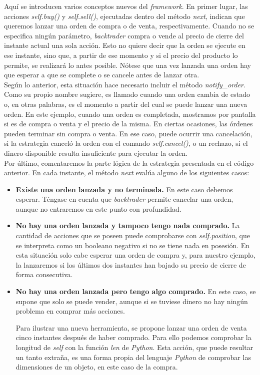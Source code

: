 		Aqu\'i se introducen varios conceptos nuevos del \textit{framework}. En primer lugar, las acciones \textit{self.buy()} y \textit{self.sell()}, ejecutadas dentro del m\'etodo \textit{next}, indican que queremos lanzar una orden de compra o de venta, respectivamente. Cuando no se especifica ning\'un par\'ametro, \textit{backtrader} compra o vende al precio de cierre del instante actual una sola acci\'on. Esto no quiere decir que la orden se ejecute en ese instante, sino que, a partir de ese momento y si el precio del producto lo permite, se realizar\'a lo antes posible. N\'otese que una vez lanzada una orden hay que esperar a que se complete o se cancele antes de lanzar otra.\\
		
		Seg\'un lo anterior, esta situaci\'on hace necesario incluir el m\'etodo \textit{notify\_order}. Como su propio nombre sugiere, es llamado cuando una orden cambia de estado o, en otras palabras, es el momento a partir del cual se puede lanzar una nueva orden. En este ejemplo, cuando una orden es completada, mostramos por pantalla si es de compra o venta y el precio de la misma. En ciertas ocasiones, las \'ordenes pueden terminar sin compra o venta. En ese caso, puede ocurrir una cancelaci\'on, si la estrategia cancel\'o la orden con el comando \textit{self.cancel()}, o un rechazo, si el dinero disponible resulta insuficiente para ejecutar la orden.\\
		
		Por \'ultimo, comentaremos la parte l\'ogica de la estrategia presentada en el c\'odigo anterior. En cada instante, el m\'etodo \textit{next} eval\'ua alguno de los siguientes casos:\\
		
		\begin{itemize}
			\item \textbf{Existe una orden lanzada y no terminada.} En este caso debemos esperar. T\'engase en cuenta que \textit{backtrader} permite cancelar una orden, aunque no entraremos en este punto con profundidad.
			\item \textbf{No hay una orden lanzada y tampoco tengo nada comprado.} La cantidad de acciones que se poseen puede comprobarse con \textit{self.position}, que se interpreta como un booleano negativo si no se tiene nada en posesi\'on. En esta situaci\'on solo cabe esperar una orden de compra y, para nuestro ejemplo, la lanzaremos si los \'ultimos dos instantes han bajado su precio de cierre de forma consecutiva.
			\item \textbf{No hay una orden lanzada pero tengo algo comprado.} En este caso, se supone que solo se puede vender, aunque si se tuviese dinero no hay ning\'un problema en comprar m\'as acciones.
			
			 Para ilustrar una nueva herramienta, se propone lanzar una orden de venta cinco instantes despu\'es de haber comprado. Para ello podemos comprobar la longitud de \textit{self} con la funci\'on \textit{len} de \textit{Python}. Esta acci\'on, que puede resultar un tanto extra\~na, es una forma propia del lenguaje \textit{Python} de comprobar las dimensiones de un objeto, en este caso de la compra.
		\end{itemize}
		
